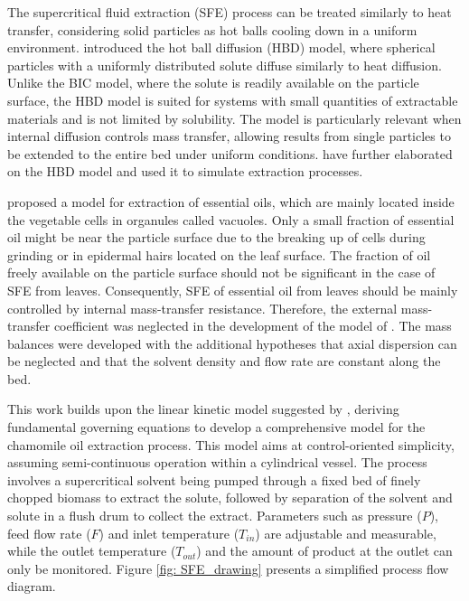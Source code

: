 \documentclass[a4paper,fleqn]{cas-dc}
\begin{document}
	The supercritical fluid extraction (SFE) process can be treated similarly to heat transfer, considering solid particles as hot balls cooling down in a uniform environment. \citet{Bartle1990} introduced the hot ball diffusion (HBD) model, where spherical particles with a uniformly distributed solute diffuse similarly to heat diffusion. Unlike the BIC model, where the solute is readily available on the particle surface, the HBD model is suited for systems with small quantities of extractable materials and is not limited by solubility. The model is particularly relevant when internal diffusion controls mass transfer, allowing results from single particles to be extended to the entire bed under uniform conditions. \citet{Reverchon1993} have further elaborated on the HBD model and used it to simulate extraction processes.
	
	\citet{Reverchon1996} proposed a model for extraction of essential oils, which are mainly located inside the vegetable cells in organules called vacuoles. Only a small fraction of essential oil might be near the particle surface due to the breaking up of cells during grinding or in epidermal hairs located on the leaf surface. The fraction of oil freely available on the particle surface should not be significant in the case of SFE from leaves. Consequently, SFE of essential oil from leaves should be mainly controlled by  internal mass-transfer resistance. Therefore, the external mass-transfer coefficient was neglected in the development of the model of \citet{Reverchon1996}. The mass balances were developed with the additional hypotheses that axial dispersion can be neglected and that the solvent density and flow rate are constant along the bed.
	
	This work builds upon the linear kinetic model suggested by \citet{Reverchon1996}, deriving fundamental governing equations to develop a comprehensive model for the chamomile oil extraction process. This model aims at control-oriented simplicity, assuming semi-continuous operation within a cylindrical vessel. The process involves a supercritical solvent being pumped through a fixed bed of finely chopped biomass to extract the solute, followed by separation of the solvent and solute in a flush drum to collect the extract. Parameters such as pressure ($P$), feed flow rate ($F$) and inlet temperature ($T_{in}$) are adjustable and measurable, while the outlet temperature ($T_{out}$) and the amount of product at the outlet can only be monitored. Figure \ref{fig: SFE_drawing} presents a simplified process flow diagram.
	
\end{document}
